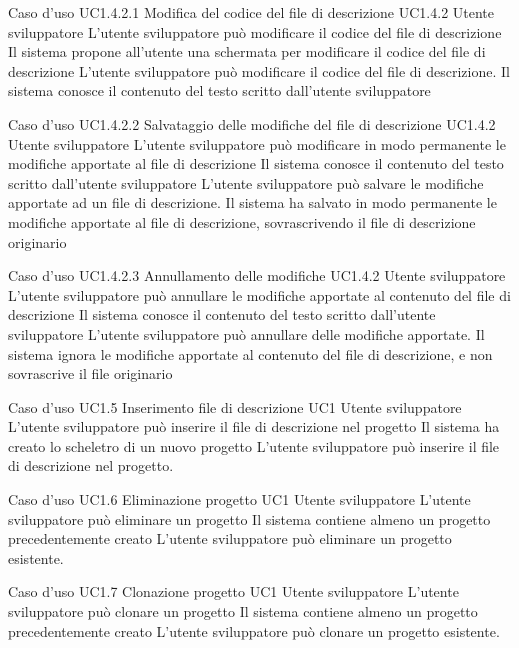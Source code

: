 \UCtitle
{Caso d'uso UC1.4.2.1}
{Modifica del codice del file di descrizione}
\UC
{UC1.4.2}
{Utente sviluppatore}
{L'utente sviluppatore può modificare il codice del file di descrizione}
{Il sistema propone all'utente una schermata per modificare il codice del file di descrizione}
\scenario
{L'utente sviluppatore può modificare il codice del file di descrizione.}
\post
{Il sistema conosce il contenuto del testo scritto dall'utente sviluppatore}

\UCtitle
{Caso d'uso UC1.4.2.2}
{Salvataggio delle modifiche del file di descrizione}
\UC
{UC1.4.2}
{Utente sviluppatore}
{L'utente sviluppatore può modificare in modo permanente le modifiche apportate al file di descrizione}
{Il sistema conosce il contenuto del testo scritto dall'utente sviluppatore}
\scenario
{L'utente sviluppatore può salvare le modifiche apportate ad un file di descrizione.}
\post
{Il sistema ha salvato in modo permanente le modifiche apportate al file di descrizione, sovrascrivendo il file di descrizione originario}

\UCtitle
{Caso d'uso UC1.4.2.3}
{Annullamento delle modifiche}
\UC
{UC1.4.2}
{Utente sviluppatore}
{L'utente sviluppatore può annullare le modifiche apportate al contenuto del file di descrizione}
{Il sistema conosce il contenuto del testo scritto dall'utente sviluppatore}
\scenario
{L'utente sviluppatore può annullare delle modifiche apportate.}
\post
{Il sistema ignora le modifiche apportate al contenuto del file di descrizione, e non sovrascrive il file originario}

\UCtitle
{Caso d'uso UC1.5}
{Inserimento file di descrizione}
\UC
{UC1}
{Utente sviluppatore}
{L'utente sviluppatore può inserire il file di descrizione nel progetto}
{Il sistema ha creato lo scheletro di un nuovo progetto}
\scenario
{L'utente sviluppatore può inserire il file di descrizione nel progetto.}

\UCtitle
{Caso d'uso UC1.6}
{Eliminazione progetto}
\UC
{UC1}
{Utente sviluppatore}
{L'utente sviluppatore può eliminare un progetto}
{Il sistema contiene almeno un progetto precedentemente creato}
\scenario
{L'utente sviluppatore può eliminare un progetto esistente.}

\UCtitle
{Caso d'uso UC1.7}
{Clonazione progetto}
\UC
{UC1}
{Utente sviluppatore}
{L'utente sviluppatore può clonare un progetto}
{Il sistema contiene almeno un progetto precedentemente creato}
\scenario
{L'utente sviluppatore può clonare un progetto esistente.}


